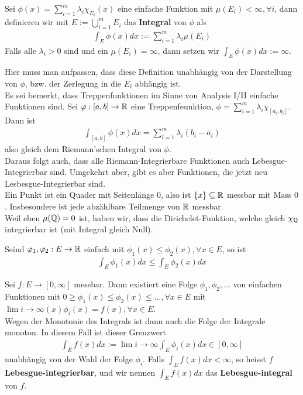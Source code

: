 \begin{definition}[]
				Sei $\phi(x) = \sum_{i = 1}^{m}\lambda_i \chi_{E_i}(x)$ eine einfache Funktion mit $\mu(E_i) < \infty, \forall i$, dann definieren wir mit $E :=  \bigcup_{i=1}^{m} E_i$ das \textbf{Integral} von $\phi$ als
	\begin{align*}
					\int_E \phi(x) dx := \sum_{i = 1}^{m} \lambda_i \mu(E_i)
	\end{align*}
	Falls alle $\lambda_i > 0$ sind und ein $\mu(E_i) = \infty$, dann setzen wir $\int_E \phi(x) dx := \infty$.
\end{definition}
Hier muss man aufpassen, dass diese Definition unabhängig von der Darstellung von $\phi$, bzw. der Zerlegung in die $E_i$ abhängig ist.\\
Es sei bemerkt, dass Treppenfunktionen im Sinne von Analysis I/II einfache Funktionen sind. Sei $\varphi: [a,b] \to \mathbb{R}$ eine Treppenfeunktion, $\phi = \sum_{i = 1}^{m} \lambda_i \chi_{[a_i,b_i]}$. Dann ist
\begin{align*}
				\int_{[a,b]} \phi(x) dx = \sum_{i = 1}^{m}\lambda_i(b_i - a_i)
\end{align*}
also gleich dem Riemann'schen Integral von $\phi$.\\
Daraus folgt auch, dass alle Riemann-Integrierbare Funktionen auch Lebesgue-Integrierbar sind. Umgekehrt aber, gibt es aber Funktionen, die jetzt neu Lesbesgue-Integrierbar sind.\\

Ein Punkt ist ein Quader mit Seitenlänge $0$, also ist $\{x\} \subseteq \mathbb{R}$ messbar mit Mass $0$. Insbesondere ist jede abzählbare Teilmenge von $\mathbb{R}$ messbar.\\
Weil eben $\mu(\mathbb{Q}) = 0$ ist, haben wir, dass die Dirichelet-Funktion, welche gleich $\chi_{\mathbb{Q}}$ integrierbar ist (mit Integral gleich Null).
\begin{lemma}[]
				Seind $\varphi_1, \varphi_2 : E \to \mathbb{R}$ einfach mit $\phi_1(x) \leq \phi_2(x), \forall x \in E$, so ist
		\begin{align*}
			\int_E \phi_1(x) dx \leq \int_E \phi_2(x) dx
			\end{align*}
\end{lemma}



\begin{definition}[]
				Sei $f: E \to [0,\infty]$ messbar. Dann existiert eine Folge $\phi_1, \phi_2, \ldots$ von einfachen Funktionen mit $0 \geq \phi_1(x) \leq \phi_2(x) \leq \ldots, \forall x \in E$ mit $\lim{i \to \infty}(x) \phi_i(x) = f(x), \forall x \in E$.\\
Wegen der Monotonie des Integrals ist dann auch die Folge der Integrale monoton. In diesem Fall ist dieser Grenzwert 
	\begin{align*}
					\int_E f(x) dx := \lim{i \to \infty}\int_E \phi_i(x) dx \in [0,\infty]
	\end{align*}
	unabhängig von der Wahl der Folge $\phi_i$. Falls $\int_E f(x) dx < \infty$, so heisst $f$ \textbf{Lebesgue-integrierbar}, und wir nennen $\int_Ef(x)dx$ das \textbf{Lebesgue-integral} von $f$.
\end{definition}

